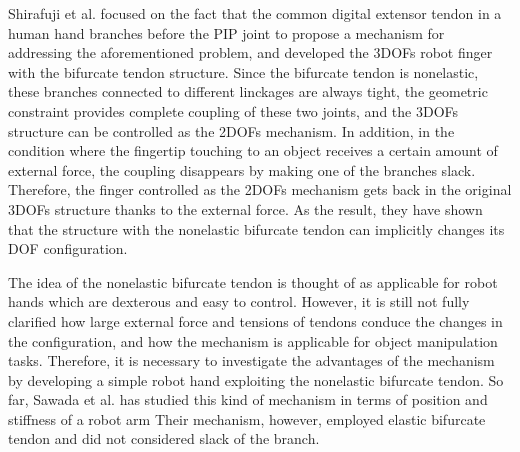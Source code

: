 \documentclass{llncs}
\begin{document}
Shirafuji et al. focused on the fact that the common digital extensor
tendon in a human hand branches before the PIP joint to propose a
mechanism for addressing the aforementioned problem, and developed the
3DOFs robot finger with the bifurcate tendon
structure\cite{Shirafuji2013}.
Since the bifurcate tendon is nonelastic, these branches connected to
different linckages are always tight, the geometric constraint provides
complete coupling of these two joints, and the 3DOFs structure can be
controlled as the 2DOFs mechanism.
In addition, in the condition where the fingertip touching to an object
receives a certain amount of external force, the coupling disappears by
making one of the branches slack.
Therefore, the finger controlled as the 2DOFs mechanism gets back in the
original 3DOFs structure thanks to the external force.
As the result, they have shown that the structure with the nonelastic
bifurcate tendon can implicitly changes its DOF configuration.

The idea of the nonelastic bifurcate tendon is thought of as applicable
for robot hands which are dexterous and easy to control.
However, it is still not fully clarified how large external force and
tensions of tendons conduce the changes in the configuration, and how
the mechanism is applicable for object manipulation tasks.
Therefore, it is necessary to investigate the advantages of the
mechanism by developing a simple robot hand exploiting the nonelastic
bifurcate tendon.
So far, Sawada et al. has studied this kind of mechanism in terms of
position and stiffness of a robot arm
Their mechanism, however, employed elastic bifurcate tendon and did not
considered slack of the branch.
\end{document}
